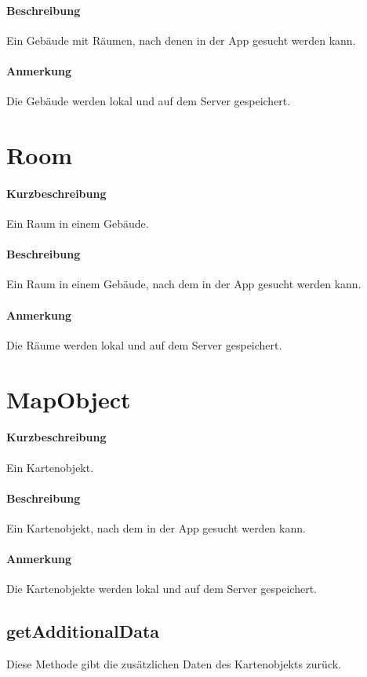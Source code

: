 \paragraph*{Beschreibung}
Ein Gebäude mit Räumen, nach denen in der App gesucht werden kann.
\paragraph*{Anmerkung}
Die Gebäude werden lokal und auf dem Server gespeichert.


\section{Room}
\paragraph*{Kurzbeschreibung}
Ein Raum in einem Gebäude.
\paragraph*{Beschreibung}
Ein Raum in einem Gebäude, nach dem in der App gesucht werden kann.
\paragraph*{Anmerkung}
Die Räume werden lokal und auf dem Server gespeichert.


\section{MapObject}
\paragraph*{Kurzbeschreibung}
Ein Kartenobjekt.
\paragraph*{Beschreibung}
Ein Kartenobjekt, nach dem in der App gesucht werden kann.
\paragraph*{Anmerkung}
Die Kartenobjekte werden lokal und auf dem Server gespeichert.

\subsection{getAdditionalData}
Diese Methode gibt die zusätzlichen Daten des Kartenobjekts zurück.
